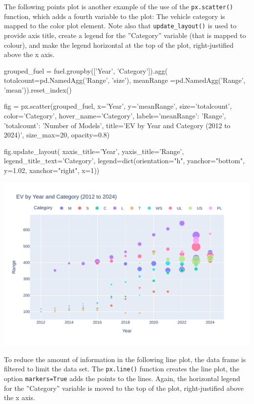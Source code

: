 The following points plot is another example of the use of the \texttt{px.scatter()} function, which adds a fourth variable to the plot: The vehicle category is mapped to the color plot element. Note also that \texttt{update\_layout()} is used to provide axis title, create a legend for the ''Category'' variable (that is mapped to colour), and make the legend horizontal at the top of the plot, right-justified above the x axis.

\begin{samepage}
\begin{pythoncode}
grouped_fuel = fuel.groupby(['Year', 'Category']).agg(
    totalcount=pd.NamedAgg('Range', 'size'),
    meanRange =pd.NamedAgg('Range', 'mean')).reset_index()

fig = px.scatter(grouped_fuel, 
    x='Year', y='meanRange', size='totalcount', 
    color='Category', hover_name='Category', 
    labels={'meanRange': 'Range', 'totalcount': 'Number of Models'},
    title='EV by Year and Category (2012 to 2024)',
    size_max=20, opacity=0.8)

fig.update_layout(
    xaxis_title='Year',
    yaxis_title='Range',
    legend_title_text='Category',
    legend=dict(orientation="h", yanchor="bottom", 
                y=1.02, xanchor="right", x=1))
\end{pythoncode}
\end{samepage}

\begin{center}
  \includegraphics[width=.8\textwidth]{px.fuel.pointsSize.pdf}
\end{center}

To reduce the amount of information in the following line plot, the data frame is filtered to limit the data set. The \texttt{px.line()} function creates the line plot, the option \texttt{markers=True} adds the points to the lines. Again, the horizontal legend for the ''Category'' variable is moved to the top of the plot, right-justified above the x axis.

